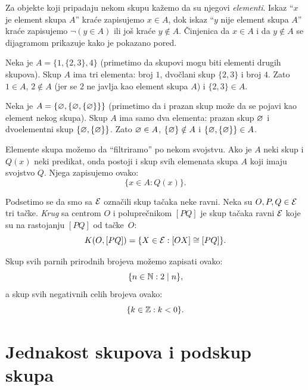 \noindent
\begin{minipage}{3in}
  \hspace*{1.5em}Za objekte koji pripadaju nekom skupu ka\v zemo da su njegovi \emph{elementi}.
  Iskaz \enquote{$x$ je element skupa $A$} kra\'ce zapisujemo $x \in A$,
  dok iskaz \enquote{$y$ nije element skupa $A$} kra\'ce zapisujemo $\lnot(y \in A)$
  ili jo\v s kra\'ce $y \notin A$.
  \v Cinjenica da $x \in A$ i da $y \notin A$ se dijagramom prikazuje kako je pokazano pored.
\end{minipage}
\hfill
\begin{minipage}{2.5in}
  \begin{center}
    
  \end{center}
\end{minipage}

\medskip

  Neka je $A = \{1, \{2, 3\}, 4\}$ (primetimo da skupovi mogu biti elementi drugih skupova).
  Skup $A$ ima tri elementa: broj $1$,
  dvo\v clani skup $\{2, 3\}$ i broj $4$. Zato $1 \in A$, $2 \notin A$ (jer se $2$ ne javlja kao element skupa $A$)
  i $\{2, 3\} \in A$.

\medskip

  Neka je $A = \{\varnothing, \{\varnothing, \{\varnothing\}\}\}$ (primetimo da i prazan skup mo\v ze da se pojavi kao element nekog skupa).
  Skup $A$ ima samo dva elementa: prazan skup $\varnothing$ i dvoelementni skup $\{\varnothing, \{\varnothing\}\}$. Zato $\varnothing \in A$, $\{\varnothing\} \notin A$ i
  $\{\varnothing, \{\varnothing\}\} \in A$.

\medskip

Elemente skupa mo\v zemo da \enquote{filtriramo} po nekom svojstvu.
Ako je $A$ neki skup i $Q(x)$ neki predikat, onda postoji i skup svih elemenata skupa $A$ koji imaju svojstvo $Q$.
Njega zapisujemo ovako:
$$
  \{ x \in A : Q(x) \}.
$$

\medskip

  Podsetimo se da smo sa $\mathcal{E}$ ozna\v cili skup ta\v caka neke ravni. Neka su $O, P, Q \in \mathcal{E}$ tri ta\v cke.
  \emph{Krug} sa centrom $O$ i polupre\v cnikom $[PQ]$ je skup ta\v caka ravni $\mathcal{E}$ koje su na rastojanju $[PQ]$ od ta\v cke~$O$:
  $$
    K(O, [PQ]) = \{X \in \mathcal{E} : [OX] \cong [PQ]\}.
  $$

  Skup svih parnih prirodnih brojeva mo\v zemo zapisati ovako:
  $$
    \{ n \in \mathbb{N} : 2 \mid n \},
  $$
  a skup svih negativnih celih brojeva ovako:
  $$
    \{ k \in \mathbb{Z} : k < 0 \}.
  $$

\section{Jednakost skupova i podskup skupa}

